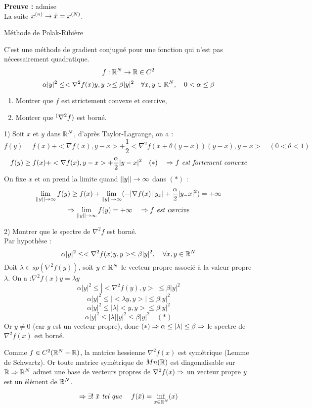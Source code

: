 \textbf{Preuve :} admise\\
La suite $x^{(n)} \rightarrow \bar{x}=x^{(N)}$.

\begin{exemple}
Méthode de Polak-Ribière

C'est une méthode de gradient conjugué pour une fonction qui n'est pas nécessairement quadratique.
\[ f:\mathbb{R}^N\rightarrow \mathbb{R} \in C^2\]
\[ \alpha |y|^2 \leq <\nabla^2f(x)y, y> \leq \beta |y|^2 \quad \forall x, y \in \mathbb{R}^N, \quad 0<\alpha\leq\beta \]

\begin{enumerate}
\item Montrer que $f$ est strictement convexe et c\oe rcive,
\item Montrer que $\sp(\nabla^2f)$ est borné.
\end{enumerate}

1) Soit $x$ et $y$ dans $\mathbb{R}^N$, d'après Taylor-Lagrange, on a : \[ f(y)=f(x)+<\nabla f(x),y-x>+\frac{1}{2}<\nabla^2 f(x+\theta(y-x))(y-x),y-x> \quad (0<\theta<1) \]
\[ f(y)\geq f(x)+<\nabla f(x),y-x>+\frac{\alpha}{2}|y-x|^2 \quad (*)\quad \Rightarrow f \textit{ est fortement convexe}\]
On fixe $x$ et on prend la limite quand $||y|| \rightarrow \infty$ dans $(*)$ : \[ \lim_{||y|| \rightarrow \infty} f(y) \geq f(x)+\lim_{||y|| \rightarrow \infty}(-|\nabla f(x)||y_x|+\frac{\alpha}{2}|y_-x|^2)=+\infty \]
\[ \Ra \lim_{||y|| \ra \infty} f(y) = +\infty \quad \Ra f \textit{ est c\oe rcive} \]

2) Montrer que le spectre de $\nabla^2f$ est borné.\\
Par hypothèse :
\[ \alpha|y|^2 \leq <\nabla^2 f(x)y,y> \leq \beta|y|^2, \quad \forall x, y\in\mathbb{R}^N \]
Doit $\lambda \in sp(\nabla^2f(y))$, soit $y\in\mathbb{R}^N$ le vecteur propre associé à la valeur propre $\lambda$. On a :$\nabla^2f(x)y=\lambda y$
\[ \alpha|y|^2 \leq |<\nabla^2 f(y),y>| \leq \beta|y|^2 \]
\[ \alpha|y|^2 \leq |<\lambda y,y>| \leq \beta|y|^2 \]
\[ \alpha|y|^2 \leq |\lambda| <y,y> \leq \beta|y|^2 \]
\[ \alpha|y|^2 \leq |\lambda| |y|^2 \leq \beta|y|^2 \quad (*)\]
Or $y\ne0$ (car $y$ est un vecteur propre), donc $(*) \Rightarrow \alpha\le |\lambda|\leq \beta \Rightarrow$ le spectre de $\nabla^2f(x)$ est borné.

\begin{remarque}
Comme $f\in C^2(\mathbb{R}^N-\mathbb{R})$, la matrice hessienne $\nabla^2f(x)$ est symétrique (Lemme de Schwartz). Or toute matrice symétrique de $Mn(\mathbb{R})$ est diagonalisable sur $\mathbb{R} \Rightarrow \mathbb{R}^N$ admet une base de vecteurs propres de $\nabla^2f(x)\Rightarrow$ un vecteur propre $y$ est un élément de $\mathbb{R}^N$.
\end{remarque}

\[ \Rightarrow\exists!\; \bar{x} \textit{ tel que } \quad f(\bar{x})=\inf_{x\in\mathbb{R}^N}(x) \]

\end{exemple}

